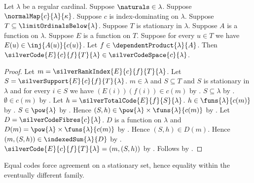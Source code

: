 \begin{theorem}\label{silver_code_in_space}
    Let $\lambda$ be a regular cardinal.
    Suppose $\naturals\in\lambda$.
    Suppose $\normalMap{c}{\lambda}{\kappa}$.
    Suppose $c$ is index-dominating on $\lambda$.
    Suppose $T\subseteq\limitOrdinalsBelow{\lambda}$.
    Suppose $T$ is stationary in $\lambda$.
    Suppose $A$ is a function on $\lambda$.
    Suppose $E$ is a function on $T$.
    Suppose for every $u\in T$ we have
        $E(u)\in\inj{A(u)}{c(u)}$.
    Let $f\in\dependentProduct{\lambda}{A}$.
    Then $\silverCode{E}{c}{f}{T}{\lambda}
        \in\silverCodeSpace{c}{\lambda}$.
\end{theorem}
\begin{proof}
    Let $m=\silverRankIndex{E}{c}{f}{T}{\lambda}$.
    Let $S=\silverSupport{E}{c}{f}{T}{\lambda}$.
    $m\in\lambda$ and $S\subseteq T$ and
        $S$ is stationary in $\lambda$ and
        for every $i\in S$ we have $(E(i))(f(i))\in c(m)$
        by .
    $S\subseteq\lambda$ by .
    $\emptyset\in c(m)$
        by .
    Let $h=\silverTotalCode{E}{f}{S}{\lambda}$.
    $h\in\funs{\lambda}{c(m)}$ by .
    $S\in\pow{\lambda}$ by .
    Hence $(S,h)\in\pow{\lambda}\times\funs{\lambda}{c(m)}$
        by .
    Let $D=\silverCodeFibres{c}{\lambda}$.
    $D$ is a function on $\lambda$ and
        $D(m)=\pow{\lambda}\times\funs{\lambda}{c(m)}$
        by .
    Hence $(S,h)\in D(m)$.
    Hence $(m,(S,h))\in\indexedSum{\lambda}{D}$
        by .
    $\silverCode{E}{c}{f}{T}{\lambda}=(m,(S,h))$
        by .
    Follows by .
\end{proof}

Equal codes force agreement on a stationary set, hence equality within
the eventually different family.

